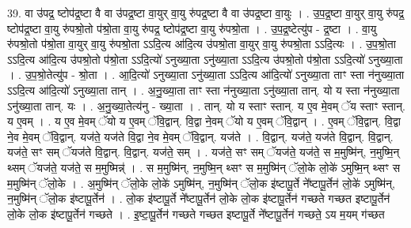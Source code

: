 \documentclass[17pt]{extarticle}
\begin{document}
39. वा उ॑पद्र॒ ष्टोप॑द्र॒ष्टा वै वा उ॑पद्र॒ष्टा वा॒युर् वा॒यु रु॑पद्र॒ष्टा वै वा उ॑पद्र॒ष्टा वा॒युः । . उ॒प॒द्र॒ष्टा वा॒युर् वा॒यु रु॑पद्र॒ ष्टोप॑द्र॒ष्टा वा॒यु रु॑पश्रो॒तो प॑श्रो॒ता वा॒यु रु॑पद्र॒ 
ष्टोप॑द्र॒ष्टा वा॒यु रु॑पश्रो॒ता । . उ॒प॒द्र॒ष्टेत्यु॑प - द्र॒ष्टा । . वा॒यु रु॑पश्रो॒तो प॑श्रो॒ता वा॒युर् वा॒यु रु॑पश्रो॒ता ऽऽदि॒त्य आ॑दि॒त्य उ॑पश्रो॒ता वा॒युर् वा॒यु रु॑पश्रो॒ता ऽऽदि॒त्यः । . उ॒प॒श्रो॒ता ऽऽदि॒त्य आ॑दि॒त्य उ॑पश्रो॒तो प॑श्रो॒ता ऽऽदि॒त्यो॑ ऽनुख्या॒ता ऽनु॑ख्या॒ता ऽऽदि॒त्य उ॑पश्रो॒तो प॑श्रो॒ता ऽऽदि॒त्यो॑ ऽनुख्या॒ता । . उ॒प॒श्रो॒तेत्यु॑प - श्रो॒ता । . आ॒दि॒त्यो॑ ऽनुख्या॒ता ऽनु॑ख्या॒ता ऽऽदि॒त्य आ॑दि॒त्यो॑ ऽनुख्या॒ता ताꣳ स्ता न॑नुख्या॒ता ऽऽदि॒त्य आ॑दि॒त्यो॑ ऽनुख्या॒ता तान् । . अ॒नु॒ख्या॒ता ताꣳ स्ता न॑नुख्या॒ता ऽनु॑ख्या॒ता तान्. यो य स्ता न॑नुख्या॒ता ऽनु॑ख्या॒ता तान्. यः । . अ॒नु॒ख्या॒तेत्य॑नु - ख्या॒ता । . तान्. यो य स्ताꣳ स्तान्. य ए॒व मे॒वम् ॅय स्ताꣳ स्तान्. य ए॒वम् । . य ए॒व मे॒वम् ॅयो य ए॒वम् ॅवि॒द्वान्. वि॒द्वा ने॒वम् ॅयो य ए॒वम् ॅवि॒द्वान् । . ए॒वम् ॅवि॒द्वान्. वि॒द्वा ने॒व मे॒वम् ॅवि॒द्वान्. यज॑ते॒ यज॑ते वि॒द्वा ने॒व मे॒वम् ॅवि॒द्वान्. यज॑ते । . वि॒द्वान्. यज॑ते॒ यज॑ते वि॒द्वान्. वि॒द्वान्. यज॑ते॒ सꣳ सम् ॅयज॑ते वि॒द्वान्. वि॒द्वान्. यज॑ते॒ सम् । . यज॑ते॒ सꣳ सम् ॅयज॑ते॒ यज॑ते॒ स म॒मुष्मि॑न्, न॒मुष्मि॒न् थ्सम् ॅयज॑ते॒ यज॑ते॒ स म॒मुष्मिन्न्॑ । . स म॒मुष्मि॑न्, न॒मुष्मि॒न् थ्सꣳ स म॒मुष्मि॑न् ॅलो॒के लो॒के॑ ऽमुष्मि॒न् थ्सꣳ स म॒मुष्मि॑न् ॅलो॒के । . अ॒मुष्मि॑न् ॅलो॒के लो॒के॑ ऽमुष्मि॑न्, न॒मुष्मि॑न् ॅलो॒क इ॑ष्टापू॒र्ते ने᳚ष्टापू॒र्तेन॑ लो॒के॑ ऽमुष्मि॑न्, न॒मुष्मि॑न् ॅलो॒क इ॑ष्टापू॒र्तेन॑ । . लो॒क इ॑ष्टापू॒र्ते ने᳚ष्टापू॒र्तेन॑ लो॒के लो॒क इ॑ष्टापू॒र्तेन॑ गच्छते गच्छत इष्टापू॒र्तेन॑ लो॒के लो॒क इ॑ष्टापू॒र्तेन॑ गच्छते । . इ॒ष्टा॒पू॒र्तेन॑ गच्छते गच्छत इष्टापू॒र्ते ने᳚ष्टापू॒र्तेन॑ गच्छते॒ ऽय म॒यम् ग॑च्छत 
\end{document}

